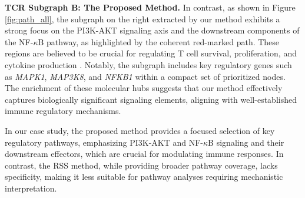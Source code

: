 \textbf{TCR Subgraph B: The Proposed Method. }  
In contrast, as shown in Figure \ref{fig:path_all}, the subgraph on the right extracted by our method exhibits a strong focus on the PI3K-AKT signaling axis \cite{PI3K} and the downstream components of the NF-\(\kappa\)B \cite{nfkb} pathway, as highlighted by the coherent red-marked path.
 These regions are believed to be crucial for regulating T cell survival, proliferation, and cytokine production \cite{nfkball}.  
Notably, the subgraph includes key regulatory genes such as \textit{MAPK1}, \textit{MAP3K8}, and \textit{NFKB1} \cite{MAPK1,NFKB1} within a compact set of prioritized nodes.  
The enrichment of these molecular hubs suggests that our method effectively captures biologically significant signaling elements, aligning with well-established immune regulatory mechanisms.  

In our case study, the proposed method provides a focused selection of key regulatory pathways, emphasizing PI3K-AKT and NF-\(\kappa\)B signaling and their downstream effectors, which are crucial for modulating immune responses. 
In contrast, the RSS method, while providing broader pathway coverage, lacks specificity, making it less suitable for pathway analyses requiring mechanistic interpretation.
